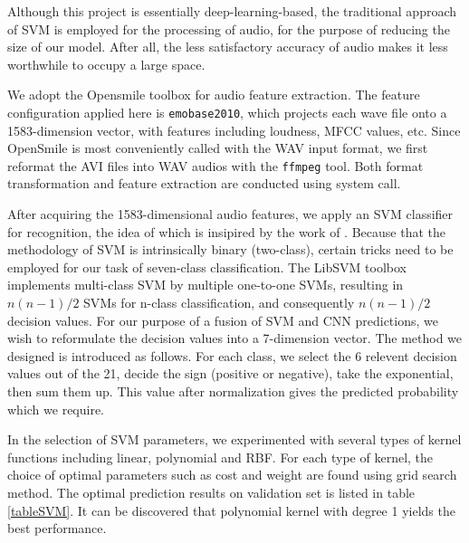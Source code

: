 \documentclass[10pt,twocolumn,letterpaper]{article}
\begin{document}
Although this project is essentially deep-learning-based, the traditional approach of SVM is employed for the processing of audio, for the purpose of reducing the size of our model. After all, the less satisfactory accuracy of audio makes it less worthwhile to occupy a large space.

We adopt the Opensmile toolbox \cite{eyben2010opensmile} for audio feature extraction. The feature configuration applied here is \texttt{emobase2010}, which projects each wave file onto a 1583-dimension vector, with features including loudness, MFCC values, etc. Since OpenSmile is most conveniently called with the WAV input format, we first reformat the AVI files into WAV audios with the \texttt{ffmpeg} tool. Both format transformation and feature extraction are conducted using system call. 

After acquiring the 1583-dimensional audio features, we apply an SVM classifier for recognition, the idea of which is insipired by the work of \cite{fan2016video}. Because that the methodology of SVM is intrinsically binary (two-class), certain tricks need to be employed for our task of seven-class classification. The LibSVM \cite{CC01a} toolbox implements multi-class SVM by multiple one-to-one SVMs, resulting in $n(n-1)/2$ SVMs for n-class classification, and consequently $n(n-1)/2$ decision values. For our purpose of a fusion of SVM and CNN predictions, we wish to reformulate the decision values into a 7-dimension vector. The method we designed is introduced as follows. For each class, we select the 6 relevent decision values out of the 21, decide the sign (positive or negative), take the exponential, then sum them up. This value after normalization gives the predicted probability which we require.

In the selection of SVM parameters, we experimented with several types of kernel functions including linear, polynomial and RBF. For each type of kernel, the choice of optimal parameters such as cost and weight are found using grid search method. The optimal prediction results on validation set is listed in table \ref{tableSVM}. It can be discovered that polynomial kernel with degree 1 yields the best performance. 
\end{document}
